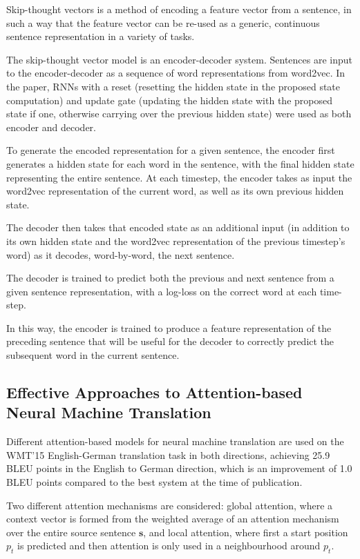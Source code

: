 \documentclass[a4paper, 12pt]{article}
\begin{document}
Skip-thought vectors is a method of encoding a feature vector from a sentence,
in such a way that the feature vector can be re-used as a generic, continuous
sentence representation in a variety of tasks.

The skip-thought vector model is an encoder-decoder system. Sentences are input
to the encoder-decoder as a sequence of word representations from word2vec. In
the paper, RNNs with a reset (resetting the hidden state in the proposed state
computation) and update gate (updating the hidden state with the proposed state
if one, otherwise carrying over the previous hidden state) were used as both
encoder and decoder.

To generate the encoded representation for a given sentence, the encoder first
generates a hidden state for each word in the sentence, with the final hidden
state representing the entire sentence. At each timestep, the encoder takes as
input the word2vec representation of the current word, as well as its own
previous hidden state.

The decoder then takes that encoded state as an additional input (in addition
to its own hidden state and the word2vec representation of the previous
timestep's word) as it decodes, word-by-word, the next sentence.

The decoder is trained to predict both the previous and next sentence from a
given sentence representation, with a log-loss on the correct word at each
time-step.

In this way, the encoder is trained to produce a feature representation of the
preceding sentence that will be useful for the decoder to correctly predict the
subsequent word in the current sentence.


\subsection{Effective Approaches to Attention-based Neural Machine
            Translation~\citet{DBLP:journals/corr/LuongPM15}}

Different attention-based models for neural machine translation are used on the
WMT'15 English-German translation task in both directions, achieving 25.9 BLEU
points in the English to German direction, which is an improvement of 1.0 BLEU
points compared to the best system at the time of publication.

Two different attention mechanisms are considered: global attention, where a
context vector is formed from the weighted average of an attention mechanism
over the entire source sentence $\mathbf{s}$, and local attention, where first
a start position $p_t$ is predicted and then attention is only used in a
neighbourhood around $p_t$.
\end{document}
